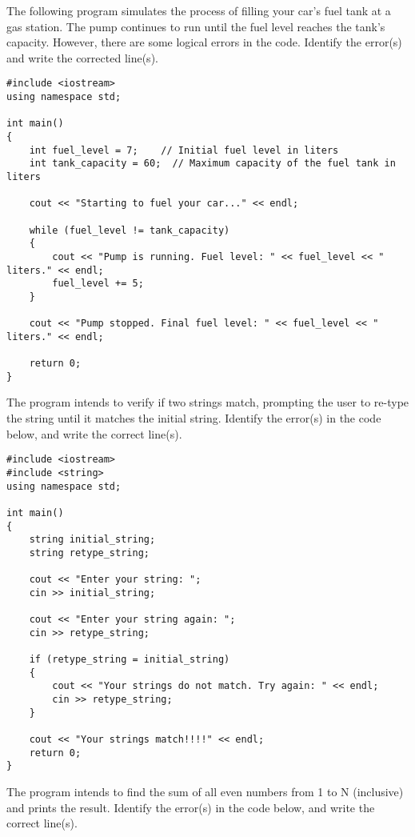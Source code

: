 \begin{multipart}
    The following program simulates the process of filling your car's fuel tank at a gas station. The pump continues to run until the fuel level reaches the tank's capacity. However, there are some logical errors in the code. Identify the error(s) and write the corrected line(s).
\end{multipart}

\begin{verbatim}
#include <iostream>
using namespace std;

int main()
{
    int fuel_level = 7;    // Initial fuel level in liters
    int tank_capacity = 60;  // Maximum capacity of the fuel tank in liters

    cout << "Starting to fuel your car..." << endl;

    while (fuel_level != tank_capacity)
    {
        cout << "Pump is running. Fuel level: " << fuel_level << " liters." << endl;
        fuel_level += 5;  
    }

    cout << "Pump stopped. Final fuel level: " << fuel_level << " liters." << endl;

    return 0;
}
\end{verbatim}

\begin{multipart}
The program intends to verify if two strings match, prompting the user to re-type the string until it matches the initial string. Identify the error(s) in the code below, and write the correct line(s).
\end{multipart}

\begin{verbatim}
#include <iostream>
#include <string>
using namespace std;

int main() 
{
    string initial_string;
    string retype_string;

    cout << "Enter your string: ";
    cin >> initial_string;

    cout << "Enter your string again: ";
    cin >> retype_string;

    if (retype_string = initial_string) 
    {
        cout << "Your strings do not match. Try again: " << endl;
        cin >> retype_string;
    }

    cout << "Your strings match!!!!" << endl;
    return 0;
}
\end{verbatim}

\begin{multipart}
The program intends to find the sum of all even numbers from 1 to N (inclusive) and prints the result. Identify the error(s) in the code below, and write the correct line(s).
\end{multipart}

